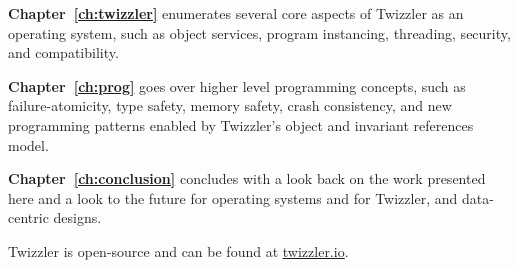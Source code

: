 \noindent\textbf{Chapter~\ref{ch:twizzler}} enumerates several core aspects of Twizzler as an operating system, such as object
services, program instancing, threading, security, and \unix compatibility.

\vspace{2em}

\noindent\textbf{Chapter~\ref{ch:prog}} goes over higher level programming concepts, such as failure-atomicity, type safety,
memory safety, crash consistency, and new programming patterns enabled by Twizzler's object and invariant references
model.

\vspace{2em}

\noindent\textbf{Chapter~\ref{ch:conclusion}} concludes with a look back on the work presented here and a look to the future for
operating systems and for Twizzler, and data-centric designs.


\chendsep

Twizzler is open-source and can be found at \url{twizzler.io}.
